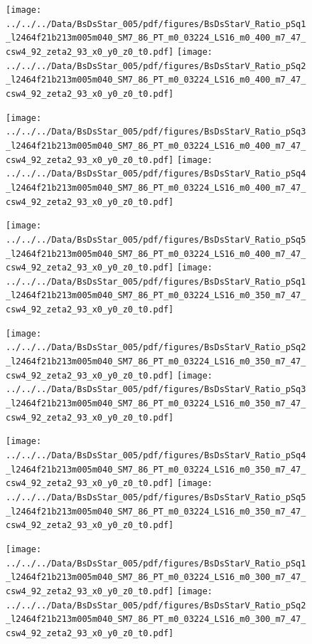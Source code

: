 \documentclass[a4paper,10pt]{article}
\begin{document}
\begin{figure}[p]
 \texttt{[image: ../../../Data/BsDsStar\_005/pdf/figures/BsDsStarV\_Ratio\_pSq1\_l2464f21b213m005m040\_SM7\_86\_PT\_m0\_03224\_LS16\_m0\_400\_m7\_47\_csw4\_92\_zeta2\_93\_x0\_y0\_z0\_t0.pdf]} 
 \texttt{[image: ../../../Data/BsDsStar\_005/pdf/figures/BsDsStarV\_Ratio\_pSq2\_l2464f21b213m005m040\_SM7\_86\_PT\_m0\_03224\_LS16\_m0\_400\_m7\_47\_csw4\_92\_zeta2\_93\_x0\_y0\_z0\_t0.pdf]} 
 \end{figure}
\begin{figure}[p]
 \texttt{[image: ../../../Data/BsDsStar\_005/pdf/figures/BsDsStarV\_Ratio\_pSq3\_l2464f21b213m005m040\_SM7\_86\_PT\_m0\_03224\_LS16\_m0\_400\_m7\_47\_csw4\_92\_zeta2\_93\_x0\_y0\_z0\_t0.pdf]} 
 \texttt{[image: ../../../Data/BsDsStar\_005/pdf/figures/BsDsStarV\_Ratio\_pSq4\_l2464f21b213m005m040\_SM7\_86\_PT\_m0\_03224\_LS16\_m0\_400\_m7\_47\_csw4\_92\_zeta2\_93\_x0\_y0\_z0\_t0.pdf]} 
 \end{figure}
\begin{figure}[p]
 \texttt{[image: ../../../Data/BsDsStar\_005/pdf/figures/BsDsStarV\_Ratio\_pSq5\_l2464f21b213m005m040\_SM7\_86\_PT\_m0\_03224\_LS16\_m0\_400\_m7\_47\_csw4\_92\_zeta2\_93\_x0\_y0\_z0\_t0.pdf]} 
 \texttt{[image: ../../../Data/BsDsStar\_005/pdf/figures/BsDsStarV\_Ratio\_pSq1\_l2464f21b213m005m040\_SM7\_86\_PT\_m0\_03224\_LS16\_m0\_350\_m7\_47\_csw4\_92\_zeta2\_93\_x0\_y0\_z0\_t0.pdf]} 
 \end{figure}
\clearpage
\begin{figure}[p]
 \texttt{[image: ../../../Data/BsDsStar\_005/pdf/figures/BsDsStarV\_Ratio\_pSq2\_l2464f21b213m005m040\_SM7\_86\_PT\_m0\_03224\_LS16\_m0\_350\_m7\_47\_csw4\_92\_zeta2\_93\_x0\_y0\_z0\_t0.pdf]} 
 \texttt{[image: ../../../Data/BsDsStar\_005/pdf/figures/BsDsStarV\_Ratio\_pSq3\_l2464f21b213m005m040\_SM7\_86\_PT\_m0\_03224\_LS16\_m0\_350\_m7\_47\_csw4\_92\_zeta2\_93\_x0\_y0\_z0\_t0.pdf]} 
 \end{figure}
\begin{figure}[p]
 \texttt{[image: ../../../Data/BsDsStar\_005/pdf/figures/BsDsStarV\_Ratio\_pSq4\_l2464f21b213m005m040\_SM7\_86\_PT\_m0\_03224\_LS16\_m0\_350\_m7\_47\_csw4\_92\_zeta2\_93\_x0\_y0\_z0\_t0.pdf]} 
 \texttt{[image: ../../../Data/BsDsStar\_005/pdf/figures/BsDsStarV\_Ratio\_pSq5\_l2464f21b213m005m040\_SM7\_86\_PT\_m0\_03224\_LS16\_m0\_350\_m7\_47\_csw4\_92\_zeta2\_93\_x0\_y0\_z0\_t0.pdf]} 
 \end{figure}
\begin{figure}[p]
 \texttt{[image: ../../../Data/BsDsStar\_005/pdf/figures/BsDsStarV\_Ratio\_pSq1\_l2464f21b213m005m040\_SM7\_86\_PT\_m0\_03224\_LS16\_m0\_300\_m7\_47\_csw4\_92\_zeta2\_93\_x0\_y0\_z0\_t0.pdf]} 
 \texttt{[image: ../../../Data/BsDsStar\_005/pdf/figures/BsDsStarV\_Ratio\_pSq2\_l2464f21b213m005m040\_SM7\_86\_PT\_m0\_03224\_LS16\_m0\_300\_m7\_47\_csw4\_92\_zeta2\_93\_x0\_y0\_z0\_t0.pdf]} 
 \end{figure}
\end{document}
